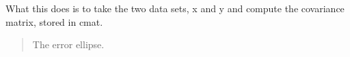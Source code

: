 \hypertarget{lst:covarianceellipse}{%
\label{lst:covarianceellipse}}%
\begin{Shaded}
\begin{Highlighting}[]
\OperatorTok{=}
\OperatorTok{=}
\OperatorTok{=}
\OperatorTok{=}
\NormalTok{covellipse([mx}\OperatorTok{,}\NormalTok{my]}\OperatorTok{,}\OperatorTok{,}\OperatorTok{=}\NormalTok{)}
\OperatorTok{!}\OperatorTok{,}\OperatorTok{,}\OperatorTok{=}\NormalTok{)}
\OperatorTok{=}\OperatorTok{!}\OperatorTok{,}
\NormalTok{)}
\end{Highlighting}
\end{Shaded}

What this does is to take the two data sets, x and y and compute the
covariance matrix, stored in cmat.

\begin{quote}
The error ellipse.
\end{quote}

